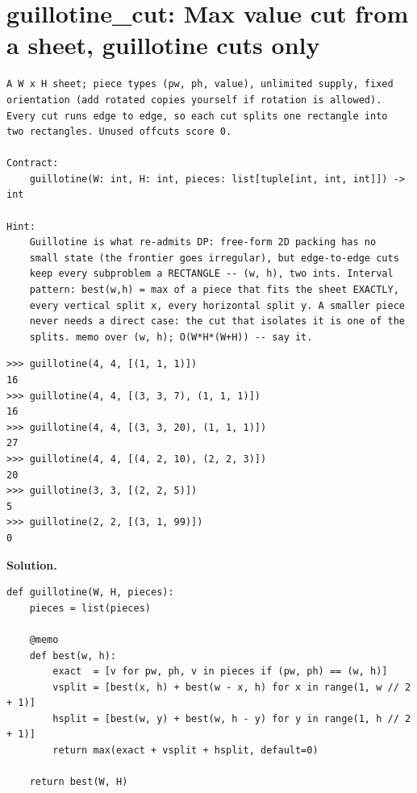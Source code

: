 \documentclass[10pt,letterpaper]{book}
\begin{document}
\section{guillotine\_cut: Max value cut from a sheet, guillotine cuts only}
\begin{lstlisting}[style=ex]
A W x H sheet; piece types (pw, ph, value), unlimited supply, fixed
orientation (add rotated copies yourself if rotation is allowed).
Every cut runs edge to edge, so each cut splits one rectangle into
two rectangles. Unused offcuts score 0.

Contract:
    guillotine(W: int, H: int, pieces: list[tuple[int, int, int]]) -> int

Hint:
    Guillotine is what re-admits DP: free-form 2D packing has no
    small state (the frontier goes irregular), but edge-to-edge cuts
    keep every subproblem a RECTANGLE -- (w, h), two ints. Interval
    pattern: best(w,h) = max of a piece that fits the sheet EXACTLY,
    every vertical split x, every horizontal split y. A smaller piece
    never needs a direct case: the cut that isolates it is one of the
    splits. memo over (w, h); O(W*H*(W+H)) -- say it.
\end{lstlisting}
\begin{lstlisting}[style=ex]
>>> guillotine(4, 4, [(1, 1, 1)])
16
>>> guillotine(4, 4, [(3, 3, 7), (1, 1, 1)])
16
>>> guillotine(4, 4, [(3, 3, 20), (1, 1, 1)])
27
>>> guillotine(4, 4, [(4, 2, 10), (2, 2, 3)])
20
>>> guillotine(3, 3, [(2, 2, 5)])
5
>>> guillotine(2, 2, [(3, 1, 99)])
0
\end{lstlisting}
\noindent\textbf{Solution.}
\begin{lstlisting}[style=code]
def guillotine(W, H, pieces):
    pieces = list(pieces)

    @memo
    def best(w, h):
        exact  = [v for pw, ph, v in pieces if (pw, ph) == (w, h)]
        vsplit = [best(x, h) + best(w - x, h) for x in range(1, w // 2 + 1)]
        hsplit = [best(w, y) + best(w, h - y) for y in range(1, h // 2 + 1)]
        return max(exact + vsplit + hsplit, default=0)

    return best(W, H)
\end{lstlisting}
\end{document}
